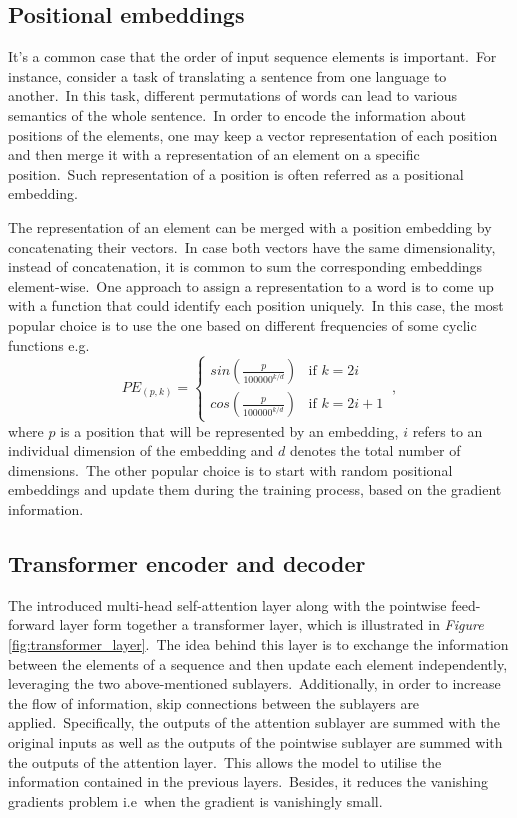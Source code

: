 \documentclass[longabstract, english, mgr]{iithesis}
\theoremstyle{default_theorem_style}\newtheorem{theorem}{Theorem}
\theoremstyle{default_theorem_style}\newtheorem{definition}{Definition}
\begin{document}
\subsection{Positional embeddings}\label{subsec:positional_embeddings}

It's a common case that the order of input sequence elements is important.\ For instance, consider a task of
translating a sentence from one language to another.\ In this task, different permutations of words can lead to
various semantics of the whole sentence.\ In order to encode the information about positions of the elements, one
may keep a vector representation of each position and then merge it with a representation of an element on a
specific position.\ Such representation of a position is often referred as a positional embedding.\newline

\noindent The representation of an element can be merged with a position embedding by concatenating their
vectors.\ In case both vectors have the same dimensionality, instead of concatenation, it is common to sum the
corresponding embeddings element-wise.\ One approach to assign a representation to a word is to come up with a
function that could identify each position uniquely.\ In this case, the most popular choice is to use the one
based on different frequencies of some cyclic functions e.g.
$$
PE_{(p, k)} =
\begin{cases}
sin(\frac{p}{100000^{k / d}}) &\text{if $k = 2i$}\\
cos(\frac{p}{100000^{k / d}}) &\text{if $k = 2i + 1$}
\end{cases}\ ,
$$
where $p$ is a position that will be represented by an embedding, $i$ refers to an individual dimension of the
embedding and $d$ denotes the total number of dimensions.\ The other popular choice is to start with random positional
embeddings and update them during the training process, based on the gradient information.

\subsection{Transformer encoder and decoder}\label{subsec:transformer_encoder_decoder}

The introduced multi-head self-attention layer along with the pointwise feed-forward layer form together a
transformer layer, which is illustrated in \textit{Figure} \ref{fig:transformer_layer}.\ The idea behind this layer is
to exchange the information between the elements of a sequence and then update each element independently, leveraging
the two above-mentioned sublayers.\ Additionally, in order to increase the flow of information, skip connections
between the sublayers are applied.\ Specifically, the outputs of the attention sublayer are summed with the original
inputs as well as the outputs of the pointwise sublayer are summed with the outputs of the attention layer.\ This
allows the model to utilise the information contained in the previous layers.\ Besides, it reduces the vanishing
gradients problem i.e\ when the gradient is vanishingly small.\newline
\end{document}
